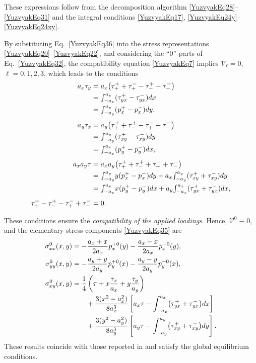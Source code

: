 \noindent These expressions follow from the decomposition algorithm
\eqref{YuzvyakEq28}--\eqref{YuzvyakEq31}
and the integral conditions
\eqref{YuzvyakEq17}, \eqref{YuzvyakEq24y}--\eqref{YuzvyakEq24xy}.

By substituting Eq.~\eqref{YuzvyakEq36} into the stress representations
\eqref{YuzvyakEq20}--\eqref{YuzvyakEq22}, and considering the ``0'' parts of
Eq.~\eqref{YuzvyakEq32}, the compatibility equation \eqref{YuzvyakEq7} implies
$\mathcal V_{\ell}=0$, $\ell=0,1,2,3$, which leads to the conditions
\begin{align}
	a_{x}\tau_{y}
	&= a_{x}\bigl(\tau_{+}^{+}+\tau_{+}^{-}-\tau_{-}^{+}-\tau_{-}^{-}\bigr)\notag\\
	&= {\textstyle\int_{-a_{x}}^{a_{x}}} (\tau_{yx}^{+}-\tau_{yx}^{-}) dx
	\notag\\
	&= {\textstyle\int_{-a_{y}}^{a_{y}}} (p_{x}^{+}-p_{x}^{-}) dy,
	\notag\\[4pt]
	a_{y}\tau_{x}
	&= a_{y}\bigl(\tau_{+}^{+}+\tau_{-}^{+}-\tau_{+}^{-}-\tau_{-}^{-}\bigr)\notag\\
	&= {\textstyle\int_{-a_{y}}^{a_{y}}} (\tau_{xy}^{+}-\tau_{xy}^{-}) dy\notag\\
	&= {\textstyle\int_{-a_{x}}^{a_{x}}} (p_{y}^{+}-p_{y}^{-}) dx,
	\notag\\[4pt]
	a_{x}a_{y}\tau
	&= a_{x}a_{y}\bigl(\tau_{+}^{+}+\tau_{-}^{+}+\tau_{+}^{-}+\tau_{-}^{-}\bigr)\notag\\
	&= {\textstyle\int_{-a_{y}}^{a_{y}}}  y (p_{x}^{+}-p_{x}^{-}) dy
	+ a_{x} {\textstyle\int_{-a_{y}}^{a_{y}}} (\tau_{xy}^{+}+\tau_{xy}^{-}) dy\notag\\
	&= {\textstyle\int_{-a_{x}}^{a_{x}}}  x (p_{y}^{+}-p_{y}^{-}) dx
	+ a_{y} {\textstyle\int_{-a_{x}}^{a_{x}}} (\tau_{yx}^{+}+\tau_{yx}^{-}) dx,
	\notag\\[4pt]
	\tau_{+}^{+}-\tau_{-}^{+}-\tau_{+}^{-}+\tau_{-}^{-} &= 0.
	\label{YuzvyakEq37}
\end{align}


These conditions ensure the \textit{compatibility of the applied loadings}.
Hence, $\mathcal V^{0}\equiv 0$, and the elementary stress components
\eqref{YuzvyakEq35} are
\begin{align}
	\sigma_{xx}^{0}(x,y)
	&= -\frac{a_{x}+x}{2a_{x}} p_{x}^{+0}(y)
	-\frac{a_{x}-x}{2a_{x}} p_{x}^{-0}(y),
	\label{YuzvyakEq38}
	\\
	\sigma_{yy}^{0}(x,y)
	&= -\frac{a_{y}+y}{2a_{y}} p_{y}^{+0}(x)
	-\frac{a_{y}-y}{2a_{y}} p_{y}^{-0}(x),
	\label{YuzvyakEq39}
	\\
	\sigma_{xy}^{0}(x,y)
	&= \frac{1}{4}\left(\tau + x \frac{\tau_{x}}{a_{x}}
	+ y \frac{\tau_{y}}{a_{y}}\right)
	\notag\\
	&\qquad
	+ \frac{3(x^{2}-a_{x}^{2})}{8 a_{x}^{3}}
	\left[a_{x}\tau-\int_{-a_{x}}^{a_{x}} \bigl(\tau_{yx}^{+}+\tau_{yx}^{-}\bigr) dx\right]\nonumber
	\\
	&\qquad
	+ \frac{3(y^{2}-a_{y}^{2})}{8 a_{y}^{3}}
	\left[a_{y}\tau-\int_{-a_{y}}^{a_{y}} \bigl(\tau_{xy}^{+}+\tau_{xy}^{-}\bigr) dy\right].
	\label{YuzvyakEq40}
\end{align}
These results coincide with those reported in
\cite{Yuzvyak30,Yuzvyak31,Yuzvyak32}
and satisfy the global equilibrium conditions.

